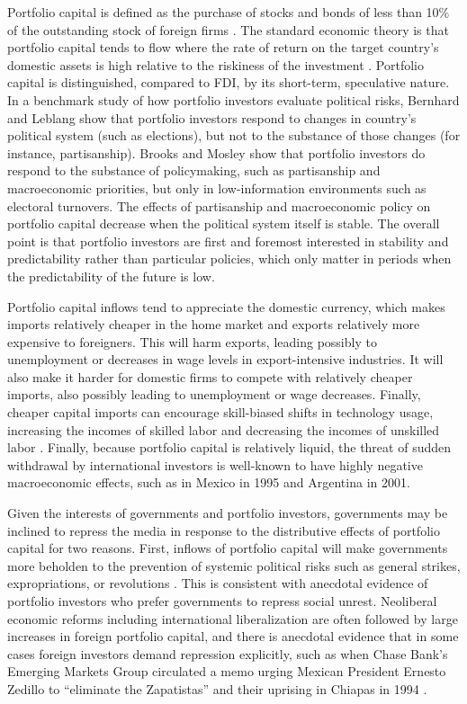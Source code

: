 \documentclass[12pt,a4paper]{article}\usepackage[]{graphicx}\usepackage[]{color}
\begin{document}
Portfolio capital is defined as the purchase of stocks and bonds of less than 10\% of the outstanding stock of foreign firms \parencites{kenen1994exchange}{Walther:1997wf}. The standard economic theory is that portfolio capital tends to flow where the rate of return on the target country's domestic assets is high relative to the riskiness of the investment \parencites[743]{mosley2003global}[685]{ISQU:ISQU420}. Portfolio capital is distinguished, compared to FDI, by its short-term, speculative nature. In a benchmark study of how portfolio investors evaluate political risks, Bernhard and Leblang \parencite*{Bernhard:2003kb} show that portfolio investors respond to changes in country's political system (such as elections), but not to the substance of those changes (for instance, partisanship). Brooks and Mosley \parencite*{Brooks:2007we} show that portfolio investors do respond to the substance of policymaking, such as partisanship and macroeconomic priorities, but only in low-information environments such as electoral turnovers. The effects of partisanship and macroeconomic policy on portfolio capital decrease when the political system itself is stable. The overall point is that portfolio investors are first and foremost interested in stability and predictability rather than particular policies, which only matter in periods when the predictability of the future is low.

Portfolio capital inflows tend to appreciate the domestic currency, which makes imports relatively cheaper in the home market and exports relatively more expensive to foreigners. This will harm exports, leading possibly to unemployment or decreases in wage levels in export-intensive industries. It will also make it harder for domestic firms to compete with relatively cheaper imports, also possibly leading to unemployment or wage decreases. Finally, cheaper capital imports can encourage skill-biased shifts in technology usage, increasing the incomes of skilled labor and decreasing the incomes of unskilled labor \parencites{Cragg:1996iy}{Ros:2000vy}. Finally, because portfolio capital is relatively liquid, the threat of sudden withdrawal by international investors is well-known to have highly negative macroeconomic effects, such as in Mexico in 1995 and Argentina in 2001.

Given the interests of governments and portfolio investors, governments may be inclined to repress the media in response to the distributive effects of portfolio capital for two reasons. First, inflows of portfolio capital will make governments more beholden to the prevention of systemic political risks such as general strikes, expropriations, or revolutions \parencite{Clark:1997jg}. This is consistent with anecdotal evidence of portfolio investors who prefer governments to repress social unrest. Neoliberal economic reforms including international liberalization are often followed by large increases in foreign portfolio capital, and there is anecdotal evidence that in some cases foreign investors demand repression explicitly, such as when Chase Bank's Emerging Markets Group circulated a memo urging Mexican President Ernesto Zedillo to “eliminate the Zapatistas” and their uprising in Chiapas in 1994 \parencite{Silverstein:1995wc}.
\end{document}
